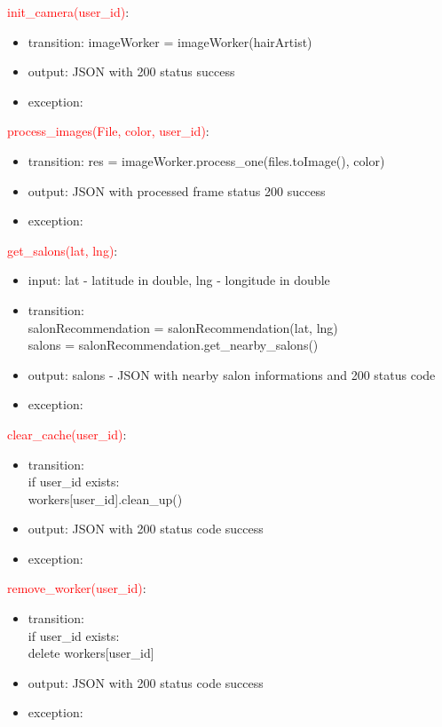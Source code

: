 \documentclass[12pt, titlepage]{article}
\begin{document}
\noindent \textcolor{red}{init\_camera(user\_id)}:
\begin{itemize}
\item transition: imageWorker = imageWorker(hairArtist)
\item output: JSON with 200 status success
\item exception: 
\end{itemize}

\noindent \textcolor{red}{process\_images(File, color, user\_id)}:
\begin{itemize}
\item transition: res = imageWorker.process\_one(files.toImage(), color)
\item output: JSON with processed frame status 200 success
\item exception: 
\end{itemize}

\noindent \textcolor{red}{get\_salons(lat, lng)}:
\begin{itemize}
\item input: lat - latitude in double, lng - longitude in double
\item transition: \\
salonRecommendation = salonRecommendation(lat, lng) \\
salons = salonRecommendation.get\_nearby\_salons()
\item output: salons - JSON with nearby salon informations and 200 status code
\item exception: 
\end{itemize}

\noindent \textcolor{red}{clear\_cache(user\_id)}:
\begin{itemize}
\item transition: \\
if user\_id exists: \\
workers[user\_id].clean\_up()
\item output: JSON with 200 status code success
\item exception: 
\end{itemize}

\noindent \textcolor{red}{remove\_worker(user\_id)}:
\begin{itemize}
\item transition: \\
if user\_id exists: \\
delete workers[user\_id]
\item output: JSON with 200 status code success
\item exception: 
\end{itemize}
\end{document}

